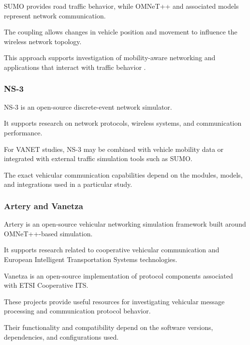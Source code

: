 SUMO provides road traffic behavior,
while OMNeT++ and associated models
represent network communication.

The coupling allows changes in
vehicle position and movement
to influence the wireless
network topology.

This approach supports investigation
of mobility-aware networking and
applications that interact with
traffic behavior \cite{Sommer2011}.

\subsubsection{NS-3}

NS-3 is an open-source discrete-event
network simulator.

It supports research on network
protocols, wireless systems,
and communication performance.

For VANET studies, NS-3 may be
combined with vehicle mobility
data or integrated with external
traffic simulation tools such
as SUMO.

The exact vehicular communication
capabilities depend on the modules,
models, and integrations used
in a particular study.

\subsubsection{Artery and Vanetza}

Artery is an open-source vehicular
networking simulation framework
built around OMNeT++-based simulation.

It supports research related
to cooperative vehicular
communication and European
Intelligent Transportation
Systems technologies.

Vanetza is an open-source
implementation of protocol
components associated with
ETSI Cooperative ITS.

These projects provide useful
resources for investigating
vehicular message processing
and communication protocol behavior.

Their functionality and compatibility
depend on the software versions,
dependencies, and configurations used.

